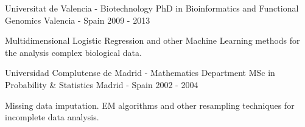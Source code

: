 


\begin{cventries}



\cventry
{Universitat de Valencia - Biotechnology} %
{PhD in Bioinformatics and Functional Genomics} %
{Valencia - Spain} %
{2009 - 2013} %
{ %
\begin{cvitems}
\item {Multidimensional Logistic Regression and other Machine Learning methods for the analysis complex biological data.}
\end{cvitems}
}

\cventry
{Universidad Complutense de Madrid - Mathematics Department} %
{MSc in Probability \& Statistics} %
{Madrid - Spain} %
{2002 - 2004} %
{ %
\begin{cvitems}
\item {Missing data imputation. EM algorithms and other resampling techniques for incomplete data analysis.}
\end{cvitems}
}


\end{cventries}
